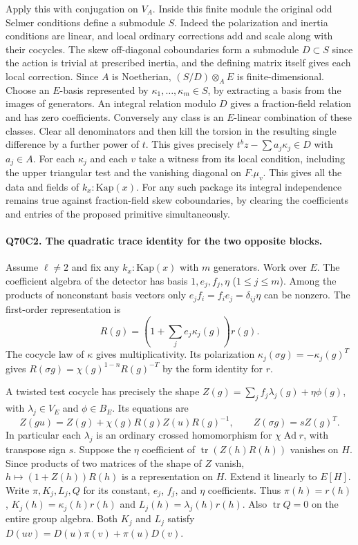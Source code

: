 Apply this with conjugation on $V_A$. Inside this finite module the
original odd Selmer conditions define a submodule $S$. Indeed the
polarization and inertia conditions are linear, and local ordinary
corrections add and scale along with their cocycles. The skew
off-diagonal coboundaries form a submodule $D\subset S$ since the
action is trivial at prescribed inertia, and the defining matrix
itself gives each local correction. Since $A$ is Noetherian,
$(S/D)\otimes_A E$ is finite-dimensional. Choose an $E$-basis
represented by $\kappa_1,\ldots,\kappa_m\in S$, by extracting a
basis from the images of generators. An integral relation modulo
$D$ gives a fraction-field relation and has zero coefficients.
Conversely any class is an $E$-linear combination of these classes.
Clear all denominators and then kill the torsion in the resulting
single difference by a further power of $t$. This gives precisely
$t^b z-\sum a_j\kappa_j\in D$ with $a_j\in A$. For each
$\kappa_j$ and each $v$ take a witness from its local condition,
including the upper triangular test and the vanishing diagonal on
$F.\mu_v$. This gives all the data and fields of $k_x:\mathrm{Kap}(x)$.
For any such package its integral independence remains true against
fraction-field skew coboundaries, by clearing the coefficients and
entries of the proposed primitive simultaneously.

\paragraph{Q70C2. The quadratic trace identity for the two opposite blocks.}
Assume $\ell\ne2$ and fix any $k_x:\mathrm{Kap}(x)$ with $m$
generators. Work over $E$. The coefficient algebra of the detector
has basis $1,e_j,f_j,\eta$ ($1\le j\le m$). Among the products of
nonconstant basis vectors only $e_j f_i=f_i e_j=\delta_{ij}\eta$
can be nonzero. The first-order representation is
\[
 R(g)=\left(1+\sum_j e_j\kappa_j(g)\right)r(g).
\]
The cocycle law of $\kappa$ gives multiplicativity. Its polarization
$\kappa_j(\sigma g)=-\kappa_j(g)^T$ gives
$R(\sigma g)=\chi(g)^{1-n}R(g)^{-T}$ by the form identity for $r$.

A twisted test cocycle has precisely the shape
$Z(g)=\sum_j f_j\lambda_j(g)+\eta\phi(g)$, with $\lambda_j\in V_E$
and $\phi\in B_E$. Its equations are
\[
 Z(gu)=Z(g)+\chi(g)R(g)Z(u)R(g)^{-1},
 \qquad Z(\sigma g)=s Z(g)^T .
\]
In particular each $\lambda_j$ is an ordinary crossed homomorphism
for $\chi\operatorname{Ad}r$, with transpose sign $s$.
Suppose the $\eta$ coefficient of $\operatorname{tr}(Z(h)R(h))$
vanishes on $H$. Since products of two matrices of the shape of
$Z$ vanish, $h\mapsto(1+Z(h))R(h)$ is a representation on $H$.
Extend it linearly to $E[H]$. Write $\pi,K_j,L_j,Q$ for its
constant, $e_j$, $f_j$, and $\eta$ coefficients. Thus
$\pi(h)=r(h)$, $K_j(h)=\kappa_j(h)r(h)$ and
$L_j(h)=\lambda_j(h)r(h)$. Also $\operatorname{tr} Q=0$
on the entire group algebra. Both $K_j$ and $L_j$ satisfy
$D(uv)=D(u)\pi(v)+\pi(u)D(v)$.

